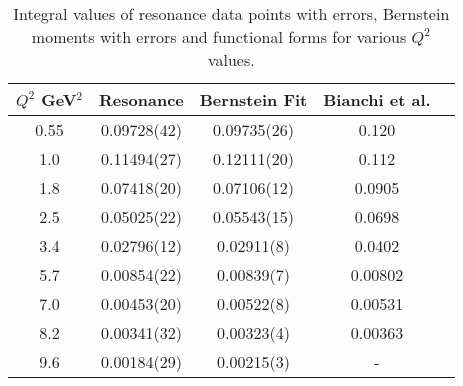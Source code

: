 \documentclass[
twocolumn,
aps,prd,
nofootinbib,
superscriptaddress,
showpacs,ligh
tightenlines, 
]{revtex4}
\begin{document}
\begin{table}[h]
\begin{center}
\begin{tabular}{|c|c|c|c|c|}
\hline
\hline
 $Q^{2} $ GeV$^{2}$ & Resonance    &  Bernstein Fit     &    Bianchi et al. \cite{Bianchi:2003hi} \\ 
\hline
\hline
  
   0.55    &        0.09728(42)        &    0.09735(26)      &   0.120      \\
   1.0       &      0.11494(27)        &    0.12111(20)    &     0.112        \\
   1.8       &      0.07418(20)        &    0.07106(12)    &     0.0905      \\
   2.5        &     0.05025(22)        &    0.05543(15)   &      0.0698         \\
   3.4          &   0.02796(12)        &    0.02911(8)      &    0.0402   \\
   5.7         &    0.00854(22)        &    0.00839(7)     &     0.00802    \\
   7.0           &  0.00453(20)        &    0.00522(8)      &    0.00531      \\
   8.2          &   0.00341(32)        &    0.00323(4)     &     0.00363     \\
   9.6         &    0.00184(29)        &    0.00215(3)    &         -   \\
      \hline
\hline
\end{tabular}
\caption{Integral values of resonance data points with errors, Bernstein moments with errors and functional forms for various $Q^{2}$ values.}
\label{table:funcint} 
\end{center}
 \end{table}
\end{document}
